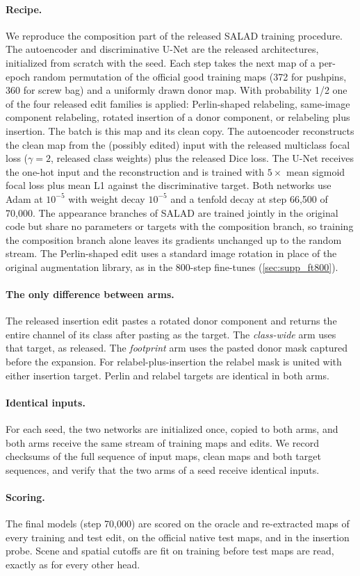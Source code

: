 \paragraph{Recipe.} We reproduce the composition part of the released SALAD training procedure. The autoencoder and discriminative U-Net are the released architectures, initialized from scratch with the seed. Each step takes the next map of a per-epoch random permutation of the official good training maps (372 for pushpins, 360 for screw bag) and a uniformly drawn donor map. With probability 1/2 one of the four released edit families is applied: Perlin-shaped relabeling, same-image component relabeling, rotated insertion of a donor component, or relabeling plus insertion. The batch is this map and its clean copy. The autoencoder reconstructs the clean map from the (possibly edited) input with the released multiclass focal loss ($\gamma=2$, released class weights) plus the released Dice loss. The U-Net receives the one-hot input and the reconstruction and is trained with $5\times$ mean sigmoid focal loss plus mean L1 against the discriminative target. Both networks use Adam at $10^{-5}$ with weight decay $10^{-5}$ and a tenfold decay at step 66{,}500 of 70{,}000. The appearance branches of SALAD are trained jointly in the original code but share no parameters or targets with the composition branch, so training the composition branch alone leaves its gradients unchanged up to the random stream. The Perlin-shaped edit uses a standard image rotation in place of the original augmentation library, as in the 800-step fine-tunes (\cref{sec:supp_ft800}).
\paragraph{The only difference between arms.} The released insertion edit pastes a rotated donor component and returns the entire channel of its class after pasting as the target. The \emph{class-wide} arm uses that target, as released. The \emph{footprint} arm uses the pasted donor mask captured before the expansion. For relabel-plus-insertion the relabel mask is united with either insertion target. Perlin and relabel targets are identical in both arms.
\paragraph{Identical inputs.} For each seed, the two networks are initialized once, copied to both arms, and both arms receive the same stream of training maps and edits. We record checksums of the full sequence of input maps, clean maps and both target sequences, and verify that the two arms of a seed receive identical inputs.
\paragraph{Scoring.} The final models (step 70{,}000) are scored on the oracle and re-extracted maps of every training and test edit, on the official native test maps, and in the insertion probe. Scene and spatial cutoffs are fit on training before test maps are read, exactly as for every other head.

